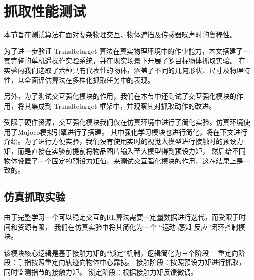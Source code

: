 \section{抓取性能测试}
本节旨在测试算法在面对复杂物理交互、物体遮挡及传感器噪声时的鲁棒性。

为了进一步验证 TransRetarget 算法在真实物理环境中的作业能力，本文搭建了一套完整的单机遥操作实验系统，并在现实场景下开展了多目标物体抓取实验。
在实验内我们选取了六种具有代表性的物体，涵盖了不同的几何形状、尺寸及物理特性，以全面评估算法在多样化抓取任务中的表现。

另外，为了测试交互强化模块的作用，我们在本节中还测试了交互强化模块的作用，将其集成到 TransRetarget 框架中，并观察其对抓取动作的改进。

受限于硬件资源，交互强化模块我们仅在仿真环境中进行了简化实验。仿真环境使用了Mujoco模拟引擎进行了搭建。
其中强化学习模块也进行简化，将在下文进行介绍。为了进行方便实验，我们没有使用实时的视觉大模型进行接触时的预设力矩，而是直接在实验前提前将物品图片输入至大模型得到预设力矩，
然后给不同物体设置了一个固定的预设力矩值，来测试交互强化模块的作用，这在结果上是一致的。

\subsection{仿真抓取实验}
由于完整学习一个可以稳定交互的RL算法需要一定量数据进行迭代，而受限于时间和资源有限，
我们在仿真实验中将其简化为一个 “运动-感知-反应”闭环控制模块。

该模块核心逻辑是基于接触力矩的“锁定”机制，逻辑简化为三个阶段：
重定向阶段：手指按照重定向轨迹向物体中心靠拢。
接触阶段：按照预设力矩进行抓取，同时监测指节的接触力矩。
锁定阶段：根据接触力矩反馈微调。

